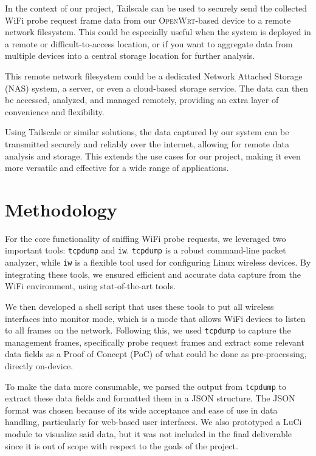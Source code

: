 \documentclass{article}
\begin{document}
In the context of our project, Tailscale can be used to securely send the collected WiFi probe request frame data from our \textsc{OpenWrt}-based device to a remote network filesystem. This could be especially useful when the system is deployed in a remote or difficult-to-access location, or if you want to aggregate data from multiple devices into a central storage location for further analysis.

This remote network filesystem could be a dedicated Network Attached Storage (NAS) system, a server, or even a cloud-based storage service. The data can then be accessed, analyzed, and managed remotely, providing an extra layer of convenience and flexibility.

Using Tailscale or similar solutions, the data captured by our system can be transmitted securely and reliably over the internet, allowing for remote data analysis and storage. This extends the use cases for our project, making it even more versatile and effective for a wide range of applications.

\section{Methodology}

For the core functionality of sniffing WiFi probe requests, we leveraged two important tools: \texttt{tcpdump} and \texttt{iw}. \texttt{tcpdump} is a robust command-line packet analyzer, while \texttt{iw} is a flexible tool used for configuring Linux wireless devices. By integrating these tools, we ensured efficient and accurate data capture from the WiFi environment, using stat-of-the-art tools.

We then developed a shell script that uses these tools to put all wireless interfaces into monitor mode, which is a mode that allows WiFi devices to listen to all frames on the network. Following this, we used \texttt{tcpdump} to capture the management frames, specifically probe request frames and extract some relevant data fields as a Proof of Concept (PoC) of what could be done as pre-processing, directly on-device.

To make the data more consumable, we parsed the output from \texttt{tcpdump} to extract these data fields and formatted them in a JSON structure. The JSON format was chosen because of its wide acceptance and ease of use in data handling, particularly for web-based user interfaces. We also prototyped a LuCi module to visualize said data, but it was not included in the final deliverable since it is out of scope with respect to the goals of the project.
\end{document}
